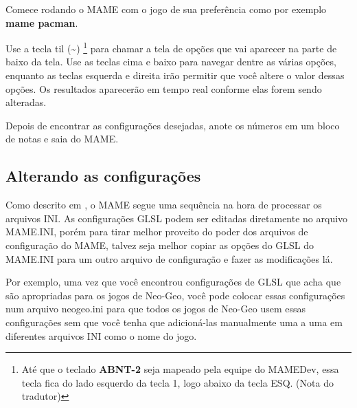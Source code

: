 \documentclass[letterpaper,10pt,brazil]{sphinxmanual}
\begin{document}
Comece rodando o MAME com o jogo de sua preferência como por exemplo
\textbf{mame pacman}.

Use a tecla til (\textbf{\textasciitilde{}}) \footnote[1]{\sphinxAtStartFootnote%
Até que o teclado \textbf{ABNT-2} seja mapeado pela equipe do MAMEDev,
essa tecla fica do lado esquerdo da tecla 1, logo abaixo da
tecla ESQ. (Nota do tradutor)
} para chamar a tela de opções que vai
aparecer na parte de baixo da tela. Use as teclas cima e baixo para
navegar dentre as várias opções, enquanto as teclas esquerda e direita
irão permitir que você altere o valor dessas opções. Os resultados
aparecerão em tempo real conforme elas forem sendo alteradas.

Depois de encontrar as configurações desejadas, anote os números em um
bloco de notas e saia do MAME.


\subsection{Alterando as configurações}
\label{advanced/glsl:alterando-as-configuracoes}
Como descrito em {\hyperref[advanced/multiconfig:advanced\string-multi\string-cfg]{}}, o MAME segue uma sequência
na hora de processar os arquivos INI. As configurações GLSL podem ser
editadas diretamente no arquivo MAME.INI, porém para tirar melhor
proveito do poder dos arquivos de configuração do MAME, talvez seja
melhor copiar as opções do GLSL do MAME.INI para um outro arquivo de
configuração e fazer as modificações lá.

Por exemplo, uma vez que você encontrou configurações de GLSL que acha
que são apropriadas para os jogos de Neo-Geo, você pode colocar essas
configurações num arquivo neogeo.ini para que todos os jogos de Neo-Geo
usem essas configurações sem que você tenha que adicioná-las manualmente
uma a uma em diferentes arquivos INI como o nome do jogo.
\end{document}

